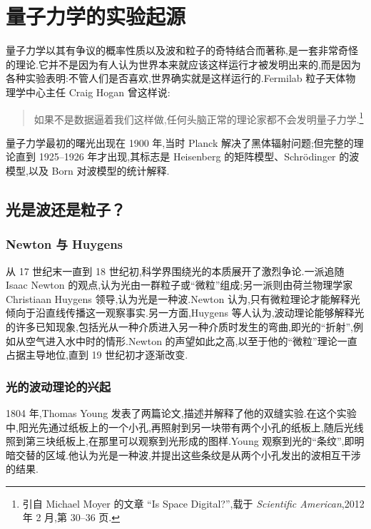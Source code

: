 \chapter{量子力学的实验起源}\label{chap:experimental-origins}

量子力学以其有争议的概率性质以及波和粒子的奇特结合而著称,是一套非常奇怪的理论.它并不是因为有人认为世界本来就应该这样运行才被发明出来的,而是因为各种实验表明:不管人们是否喜欢,世界确实就是这样运行的.Fermilab 粒子天体物理学中心主任 Craig Hogan 曾这样说:

\begin{quote}
如果不是数据逼着我们这样做,任何头脑正常的理论家都不会发明量子力学.\footnote{引自 Michael Moyer 的文章 ``Is Space Digital?'',载于 \textit{Scientific American},2012 年 2 月,第 30--36 页.}
\end{quote}

量子力学最初的曙光出现在 1900 年,当时 Planck 解决了黑体辐射问题;但完整的理论直到 1925--1926 年才出现,其标志是 Heisenberg 的矩阵模型、Schrödinger 的波模型,以及 Born 对波模型的统计解释.

\section{光是波还是粒子？}\label{sec:light-wave-or-particle}

\subsection{Newton 与 Huygens}\label{subsec:newton-huygens}

从 17 世纪末一直到 18 世纪初,科学界围绕光的本质展开了激烈争论.一派追随 Isaac Newton 的观点,认为光由一群粒子或“微粒”组成;另一派则由荷兰物理学家 Christiaan Huygens 领导,认为光是一种波.Newton 认为,只有微粒理论才能解释光倾向于沿直线传播这一观察事实.另一方面,Huygens 等人认为,波动理论能够解释光的许多已知现象,包括光从一种介质进入另一种介质时发生的弯曲,即光的“折射”,例如从空气进入水中时的情形.Newton 的声望如此之高,以至于他的“微粒”理论一直占据主导地位,直到 19 世纪初才逐渐改变.

\subsection{光的波动理论的兴起}\label{subsec:wave-theory-light}

1804 年,Thomas Young 发表了两篇论文,描述并解释了他的双缝实验.在这个实验中,阳光先通过纸板上的一个小孔,再照射到另一块带有两个小孔的纸板上,随后光线照到第三块纸板上,在那里可以观察到光形成的图样.Young 观察到光的“条纹”,即明暗交替的区域.他认为光是一种波,并提出这些条纹是从两个小孔发出的波相互干涉的结果.

